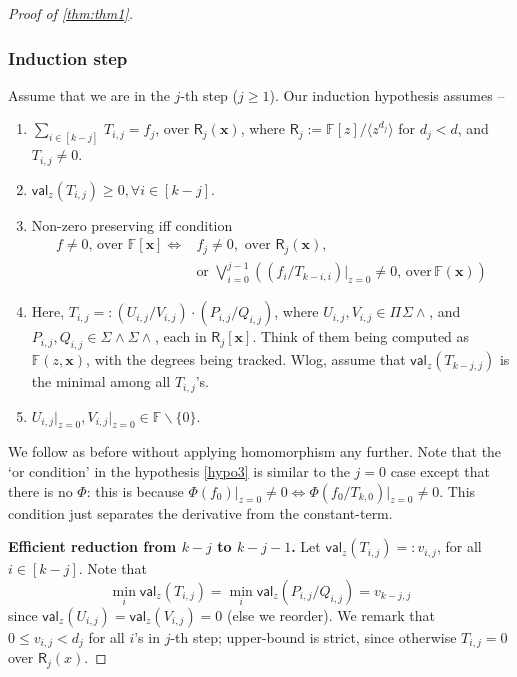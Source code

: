 \documentclass[10pt,a4paper]{article}
\newcommand{\F}{\mathbb{F}}
\newcommand{\ringR}{\mathsf{R}}
\newcommand{\x}{{\boldsymbol x}}
\newcommand{\val}{\mathsf{val}}
\newcommand{\PSU}[2]{\Pi^{#1} \Sigma\wedge^{#2}}
\newcommand{\SWSU}[2]{\Sigma^{#1}\!\wedge\!\Sigma\!\wedge^{#2}}
\numberwithin{equation}{section}
\begin{document}
\begin{proof}[Proof of \autoref{thm:thm1}]
\vspace*{1em}
\subsubsection*{Induction step} 

Assume that we are in the $j$-th step ($j\ge1$). Our induction hypothesis assumes --

\begin{enumerate}
    \item $\sum_{i \in [k-j]}\, T_{i,j} = f_j$, over $\ringR_j(\x)$, where $\ringR_j:= \F[z]/\langle z^{d_j}\rangle$ for \(d_j < d\), and $T_{i,j} \ne 0$. \label{hypo1}
    \item $\val_{z}(T_{i,j}) \ge 0, \forall i \in [k-j]$. \label{hypo2}
    \item Non-zero preserving iff condition
    \begin{align*} 
        f \neq 0 \text{, over } \F[\x] \iff & f_j \ne 0, \text{ over } \ringR_j(\x), \\
        & \text{or }\bigvee_{i=0}^{j-1} \left((f_i/T_{k-i,i}) \rvert_{z=0}\ne 0,\, \text{over}\,\F(\x)\right)
    \end{align*} \label{hypo3}
    \item Here, $T_{i,j}=: \left( U_{i,j}/V_{i,j} \right) \cdot \left( P_{i,j}/Q_{i,j} \right)$, where $U_{i,j}, V_{i,j} \in \PSU{}{}$, and $P_{i,j}, Q_{i,j} \in \SWSU{}{}$, each in $\ringR_j[\x]$. Think of them being computed as $\F(z,\x)$, with the degrees being tracked. Wlog, assume that $\val_{z}(T_{k-j,j})$ is the minimal among all $T_{i,j}$'s. \label{hypo4}
    \item $U_{i,j}\rvert_{z=0}, V_{i,j}\rvert_{z=0}  \in \F\backslash \{0\}$. \label{hypo5}
\end{enumerate} 

We follow as before without applying homomorphism any further. Note that the `or condition' in the hypothesis \ref{hypo3} is similar to the $j=0$ case except that there is no $\Phi$: this is because $\Phi(f_0)\rvert_{z=0} \ne 0 \iff \Phi(f_0/T_{k,0})\rvert_{z=0} \ne 0$. This condition just separates the derivative from the constant-term.

\textbf{Efficient reduction from $k-j$ to $k-j-1$.} Let $\val_{z}(T_{i,j})=:v_{i,j}$, for all $i \in [k-j]$. Note that \[\min_{i} \val_{z}(T_{i,j})=\min_{i}\val_{z}(P_{i,j}/Q_{i,j})=v_{k-j,j}\] since $\val_{z}(U_{i,j}) =\val_{z}(V_{i,j}) =0$ (else we reorder). We remark that  $ 0 \le v_{i,j} < d_j$ for all $i$'s in $j$-th step; upper-bound is strict, since otherwise $T_{i,j}=0$ over $\ringR_j(x)$.


\end{proof}
\end{document}
